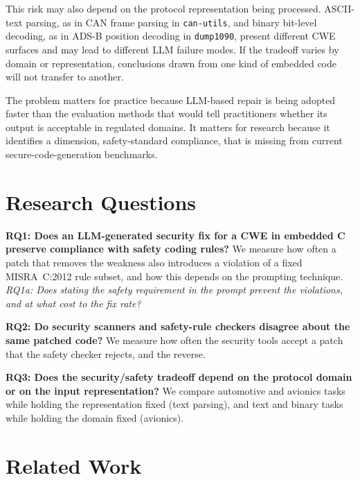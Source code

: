 \documentclass[12pt]{IEEEtran}
\begin{document}
This risk may also depend on the protocol representation being processed. ASCII-text parsing, as in CAN frame parsing in \texttt{can-utils}, and binary bit-level decoding, as in ADS-B position decoding in \texttt{dump1090}, present different CWE surfaces and may lead to different LLM failure modes. If the tradeoff varies by domain or representation, conclusions drawn from one kind of embedded code will not transfer to another.

The problem matters for practice because LLM-based repair is being adopted faster than the evaluation methods that would tell practitioners whether its output is acceptable in regulated domains. It matters for research because it identifies a dimension, safety-standard compliance, that is missing from current secure-code-generation benchmarks.


\section{Research Questions}

\textbf{RQ1: Does an LLM-generated security fix for a CWE in embedded C preserve compliance with safety coding rules?}
We measure how often a patch that removes the weakness also introduces a violation of a fixed MISRA~C:2012 rule subset, and how this depends on the prompting technique.
\emph{RQ1a: Does stating the safety requirement in the prompt prevent the violations, and at what cost to the fix rate?}

\textbf{RQ2: Do security scanners and safety-rule checkers disagree about the same patched code?}
We measure how often the security tools accept a patch that the safety checker rejects, and the reverse.

\textbf{RQ3: Does the security/safety tradeoff depend on the protocol domain or on the input representation?}
We compare automotive and avionics tasks while holding the representation fixed (text parsing), and text and binary tasks while holding the domain fixed (avionics).

\section{Related Work}
\end{document}

